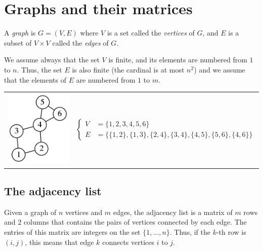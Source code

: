 \section{Graphs and their matrices}


A \emph{graph} is $G=(V,E)$ where $V$ is a set called the
\emph{vertices} of $G$, and $E$ is a subset of $V\times V$ called the
\emph{edges} of $G$.



We assume always that the set $V$ is finite, and its elements are numbered
from $1$ to $n$.  Thus, the set $E$ is also finite (the cardinal is at most
$n^2$) and we assume that the elements of $E$ are numbered from $1$ to $m$.


\begin{tabular}{ll}
\includegraphics{graph1.png} &
$\begin{cases}
V  & = \{1,2,3,4,5,6\} \\
E  & = \{ \{1,2\},\{1,3\},\{2,4\},\{3,4\},\{4,5\},\{5,6\},\{4,6\} \}
\end{cases}$
\end{tabular}


\subsection{The adjacency list}


Given a graph of $n$ vertices and $m$ edges,
the adjacency list is a matrix
of $m$ rows and $2$ columns that contains the pairs of vertices connected by
each edge.  The entries of this matrix are integers on the set
$\{1,\ldots,n\}$. Thus, if the $k$-th row is $(i,j)$, this means that edge
$k$ connects vertices $i$ to $j$.

